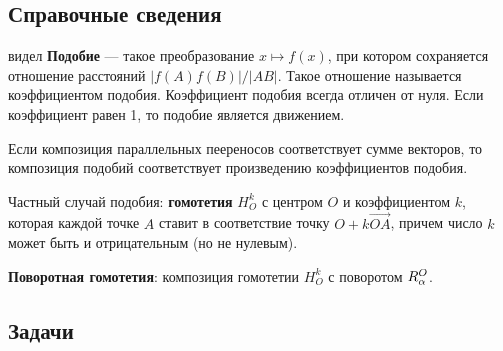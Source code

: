 \subsection*{Справочные сведения}
видел
\textbf{Подобие} --- такое преобразование $x\mapsto f(x)$, при котором сохраняется отношение расстояний $|f(A)f(B)|/|AB|$. Такое отношение называется коэффициентом подобия. Коэффициент подобия всегда отличен от нуля. Если коэффициент равен 1, то подобие является движением.

Если композиция параллельных пеереносов соответствует сумме векторов, то композиция подобий соответствует произведению коэффициентов подобия.

Частный случай подобия: \textbf{гомотетия} $H_O^k$ с центром $O$ и коэффициентом $k$, которая каждой точке $A$ ставит в соответствие точку $O+k\vec{OA}$, причем число $k$ может быть и отрицательным (но не нулевым).

\textbf{Поворотная гомотетия}: композиция гомотетии $H_O^k$ с поворотом $R_\alpha^O$.



\subsection*{Задачи}

